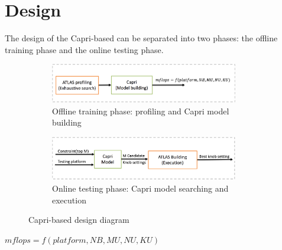\section{Design}
\label{sec:design}

The design of the Capri-based \atl can be separated into two phases: the offline
training phase and the online testing phase.

\begin{figure}[tbhp]
  \centering
  \begin{subfigure}[b]{1.0\linewidth}
    \centering
    \includegraphics[width=0.9\textwidth]{images/offline_training.png}
    \caption{Offline training phase: \atl profiling and Capri model building}
  \end{subfigure}
  \begin{subfigure}[b]{1.0\linewidth}
    \centering
    \includegraphics[width=0.9\textwidth]{images/testing.png}
    \caption{Online testing phase: Capri model searching and \atl execution}
  \end{subfigure}
  \caption{Capri-based \atl design diagram}
  \label{fig:offline_training}
\end{figure}

$mflops = f(platform, NB, MU, NU, KU)$
